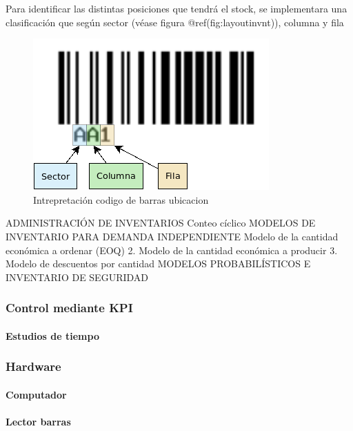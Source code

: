 \documentclass[
]{article}
\begin{document}
Para identificar las distintas posiciones que tendrá el stock, se
implementara una clasificación que según sector (véase figura
@ref(fig:layoutinvnt)), columna y fila

\begin{figure}[H]

{\centering \includegraphics[width=0.5\linewidth]{marco teorico/image/barEstruc} 

}

\caption{Intrepretación codigo de barras ubicacion}\label{fig:unnamed-chunk-14}
\end{figure}

ADMINISTRACIÓN DE INVENTARIOS Conteo cíclico MODELOS DE INVENTARIO PARA
DEMANDA INDEPENDIENTE Modelo de la cantidad económica a ordenar (EOQ) 2.
Modelo de la cantidad económica a producir 3. Modelo de descuentos por
cantidad MODELOS PROBABILÍSTICOS E INVENTARIO DE SEGURIDAD

\hypertarget{control-mediante-kpi}{%
\subsubsection{Control mediante KPI}\label{control-mediante-kpi}}

\hypertarget{estudios-de-tiempo}{%
\paragraph{Estudios de tiempo}\label{estudios-de-tiempo}}

\hypertarget{hardware}{%
\subsubsection{Hardware}\label{hardware}}

\hypertarget{computador}{%
\paragraph{Computador}\label{computador}}

\hypertarget{lector-barras}{%
\paragraph{Lector barras}\label{lector-barras}}
\end{document}
